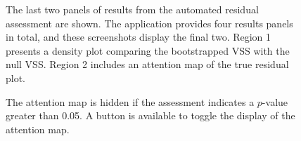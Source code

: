 \documentclass[
doublespace,
  times]{anzsauth}
\begin{document}
\begin{figure}


\caption{\label{fig-autovi-web-result2}The last two panels of results
from the automated residual assessment are shown. The application
provides four results panels in total, and these screenshots display the
final two. Region 1 presents a density plot comparing the bootstrapped
VSS with the null VSS. Region 2 includes an attention map of the true
residual plot.}

\end{figure}%

\begin{figure}


\caption{\label{fig-autovi-web-gradient-hide}The attention map is hidden
if the assessment indicates a \(p\)-value greater than 0.05. A button is
available to toggle the display of the attention map.}

\end{figure}%
\end{document}
